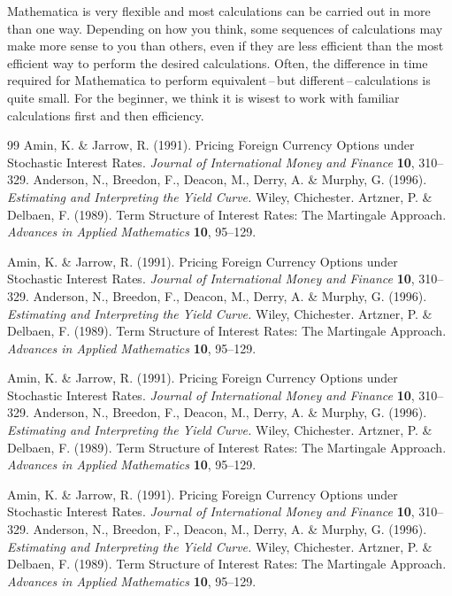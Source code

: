 \documentclass{Base}
\begin{document}
Mathematica is very flexible and most calculations can be carried
out in more than one way.  Depending on how you think, some
sequences of calculations may make more sense to you than others,
even if they are less efficient than the most efficient way to
perform the desired calculations.  Often, the difference in time
required for Mathematica to perform equivalent\,--\,but
different\,--\,calculations is quite small.  For the beginner, we
think it is wisest to work with familiar calculations first and
then efficiency.

\begin{thenumbibliography}{99}
Amin, K. \& Jarrow, R.  (1991).  Pricing Foreign Currency Options under
Stochastic Interest Rates.
{\em Journal of International Money and Finance} {\bf 10}, 310--329.
%
Anderson, N., Breedon, F., Deacon, M., Derry, A. \& Murphy, G. (1996).
{\em Estimating and Interpreting the Yield Curve.} Wiley, Chichester.
%
Artzner, P. \& Delbaen, F.  (1989). Term Structure of Interest Rates: The Martingale Approach.
{\em Advances in Applied Mathematics} {\bf 10}, 95--129.

Amin, K. \& Jarrow, R.  (1991).  Pricing Foreign Currency Options
under Stochastic Interest Rates. {\em Journal of International
Money and Finance} {\bf 10}, 310--329.
%
Anderson, N., Breedon, F., Deacon, M., Derry, A. \& Murphy, G.
(1996). {\em Estimating and Interpreting the Yield Curve.} Wiley,
Chichester.
%
Artzner, P. \& Delbaen, F.  (1989). Term Structure of Interest
Rates: The Martingale Approach. {\em Advances in Applied
Mathematics} {\bf 10}, 95--129.

Amin, K. \& Jarrow, R.  (1991).  Pricing Foreign Currency Options
under Stochastic Interest Rates. {\em Journal of International
Money and Finance} {\bf 10}, 310--329.
%
Anderson, N., Breedon, F., Deacon, M., Derry, A. \& Murphy, G.
(1996). {\em Estimating and Interpreting the Yield Curve.} Wiley,
Chichester.
%
Artzner, P. \& Delbaen, F.  (1989). Term Structure of Interest
Rates: The Martingale Approach. {\em Advances in Applied
Mathematics} {\bf 10}, 95--129.

Amin, K. \& Jarrow, R.  (1991).  Pricing Foreign Currency Options
under Stochastic Interest Rates. {\em Journal of International
Money and Finance} {\bf 10}, 310--329.
%
Anderson, N., Breedon, F., Deacon, M., Derry, A. \& Murphy, G.
(1996). {\em Estimating and Interpreting the Yield Curve.} Wiley,
Chichester.
%
Artzner, P. \& Delbaen, F.  (1989). Term Structure of Interest
Rates: The Martingale Approach. {\em Advances in Applied
Mathematics} {\bf 10}, 95--129.


\end{thenumbibliography}
\end{document}
